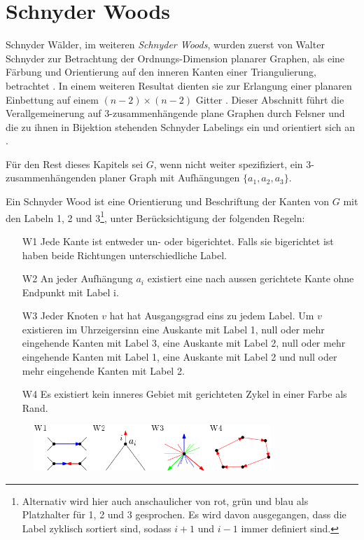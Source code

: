 \section{Schnyder Woods}\label{sw}
Schnyder Wälder, im weiteren \textit{Schnyder Woods}, wurden zuerst von Walter Schnyder zur Betrachtung der Ordnungs-Dimension planarer Graphen, als eine Färbung und Orientierung auf den inneren Kanten einer Triangulierung, betrachtet \cite{schnyder89}. In einem weiteren Resultat dienten sie zur Erlangung einer planaren Einbettung auf einem $(n-2)\times(n-2)$ Gitter \cite{schnyder90}. Dieser Abschnitt führt die Verallgemeinerung auf 3-zusammenhängende plane Graphen durch Felsner \cite{felsner01} und die zu ihnen in Bijektion stehenden Schnyder Labelings ein und orientiert sich an \cite{felsner04}.\

Für den Rest dieses Kapitels sei $G$, wenn nicht weiter spezifiziert, ein 3-zusammenhängenden planer Graph mit Aufhängungen $\{a_1,a_2,a_3\}$.

\begin{definition}
Ein Schnyder Wood ist eine Orientierung und Beschriftung der Kanten von $G$ mit den Labeln 1, 2 und 3\footnote{Alternativ wird hier auch anschaulicher von rot, grün und blau als Platzhalter für 1, 2 und 3 gesprochen. Es wird davon ausgegangen, dass die Label zyklisch sortiert sind, sodass $i+1$ und $i-1$ immer definiert sind.}, unter Berücksichtigung der folgenden Regeln:
\begin{itemize}
\item[W1] Jede Kante ist entweder un- oder bigerichtet. Falls sie bigerichtet ist haben beide Richtungen unterschiedliche Label.
\item[W2] An jeder Aufhängung  $a_i$ existiert eine nach aussen gerichtete Kante ohne Endpunkt mit Label i.  
\item[W3] Jeder Knoten $v$ hat hat Ausgangsgrad eins zu jedem Label. Um $v$ existieren im Uhrzeigersinn eine Auskante mit Label 1, null oder mehr eingehende Kanten mit Label 3, eine Auskante mit Label 2, null oder mehr  eingehende Kanten mit Label 1, eine Auskante mit Label 2 und null oder mehr  eingehende Kanten mit Label 2.
\item[W4] Es existiert kein inneres Gebiet mit gerichteten Zykel in einer Farbe als Rand.
\end{itemize}
\end{definition}

\begin{figure}[h]
	\centering
  \includegraphics[width=0.8\textwidth]{schnyder_wood_def.png}
\end{figure}

